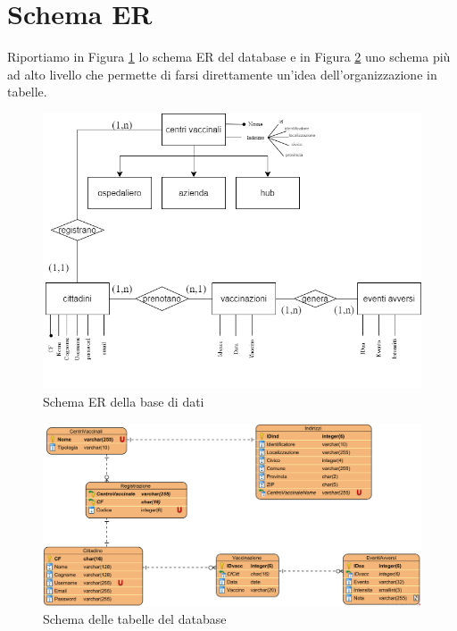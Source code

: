\section{Schema ER}

	Riportiamo in Figura \ref{fig:schemaER} lo schema ER del database e in Figura \ref{fig:schemaTabelle} uno schema più ad alto livello che permette di farsi direttamente un'idea dell'organizzazione in tabelle.
	
\begin{figure}[h]
	\includegraphics[width=\textwidth]{./img/ER}
	\caption{Schema ER della base di dati}
	\label{fig:schemaER}
\end{figure}

\begin{figure}[h]
	\includegraphics[width=\textwidth]{./img/CentriVaccinaliDB}
	\caption{Schema delle tabelle del database}
	\label{fig:schemaTabelle}
\end{figure}
